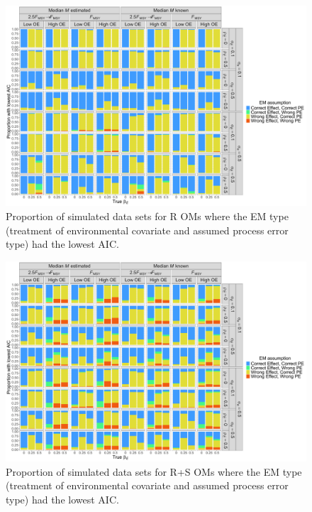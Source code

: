 \documentclass[
  12pt,
]{article}
\begin{document}
\begin{landscape}
\begin{figure}
\begin{center}
\includegraphics[height = \textheight]{aic_Rom}
\end{center}
\caption{Proportion of simulated data sets for R OMs where the EM type (treatment of environmental covariate and assumed process error type) had the lowest AIC.}\label{aic_Rom}
\end{figure}
\end{landscape}

\begin{landscape}
\begin{figure}
\begin{center}
\includegraphics[height = \textheight]{aic_RSom}
\end{center}
\caption{Proportion of simulated data sets for R+S OMs where the EM type (treatment of environmental covariate and assumed process error type) had the lowest AIC.}\label{aic_RSom}
\end{figure}
\end{landscape}
\end{document}
